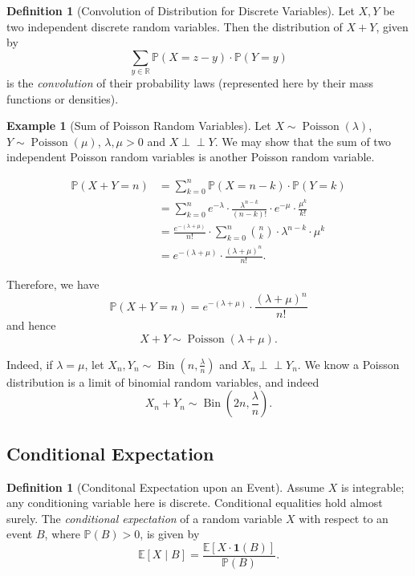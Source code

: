 \documentclass[11pt]{article}
\numberwithin{equation}{section}
\theoremstyle{definition}
\newtheorem{definition}[theorem]{Definition}
\newtheorem{example}[theorem]{Example}
\theoremstyle{remark}
\newcommand{\pqty}[1]{\left(#1\right)}
\newcommand{\bqty}[1]{\left[#1\right]}
\newcommand{\RR}{\mathbb R}
\newcommand{\indicator}{\mathbf 1}
\newcommand{\Prob}{\mathbb P}
\newcommand{\Expt}{\mathbb E}
\newcommand{\indp}{\mathrel{\perp\!\!\!\perp}}
\newcommand{\Conditional}[2]{#1\mid #2}
\newcommand{\Binomial}{\operatorname{Bin}}
\newcommand{\Poisson}{\operatorname{Poisson}}
\begin{document}
\begin{definition}[Convolution of Distribution for Discrete Variables]\label{probability-definition-033}
    \label{probability-def:convolution-distribution-discrete}%
    Let \(X, Y\) be two independent discrete random variables. Then the distribution of \(X + Y\), given by
    \[
        \sum_{y \in \RR} \Prob\pqty{X = z - y} \cdot \Prob\pqty{Y = y}
    \]
    is the \emph{convolution} of their probability laws (represented here by their mass functions or densities).
\end{definition}

\begin{example}[Sum of Poisson Random Variables]\label{probability-example-026}
    Let \(X \sim \Poisson\pqty{\lambda}\), \(Y \sim \Poisson\pqty{\mu}\), \(\lambda, \mu > 0\) and \(X \indp Y\). We may show that the sum of two independent Poisson random variables is another Poisson random variable.

    \begin{align*}
        \Prob\pqty{X + Y = n} &= \sum_{k = 0}^{n} \Prob\pqty{X = n - k} \cdot \Prob\pqty{Y = k} \\
        &= \sum_{k = 0}^{n} e^{-\lambda} \cdot \frac{\lambda^{n - k}}{\pqty{n - k}!} \cdot e^{-\mu} \cdot \frac{\mu^k}{k!} \\
        &= \frac{e^{-\pqty{\lambda + \mu}}}{n!} \cdot \sum_{k = 0}^{n} \binom{n}{k} \cdot \lambda^{n - k} \cdot \mu^k \\
        &= e^{-\pqty{\lambda + \mu}} \cdot \frac{\pqty{\lambda + \mu}^n}{n!}.
    \end{align*}

    Therefore, we have
    \[
        \Prob\pqty{X + Y = n} = e^{-\pqty{\lambda + \mu}} \cdot \frac{\pqty{\lambda + \mu}^n}{n!}
    \]
    and hence
    \[
        X + Y \sim \Poisson \pqty{\lambda + \mu}.
    \]

    Indeed, if \(\lambda = \mu\), let \(X_n, Y_n \sim \Binomial\pqty{n, \frac{\lambda}{n}}\) and \(X_n \indp Y_n\). We know a Poisson distribution is a limit of binomial random variables, and indeed
    \[
        X_n + Y_n \sim \Binomial\pqty{2n, \frac{\lambda}{n}}.
    \]
\end{example}

\subsection{Conditional Expectation}

\begin{definition}[Conditonal Expectation upon an Event]\label{probability-definition-034}
    \label{probability-def:conditional-expectation-upon-event}
Assume \(X\) is integrable; any conditioning variable here is discrete. Conditional equalities hold almost surely.
%
    The \emph{conditional expectation} of a random variable \(X\) with respect to an event \(B\), where \(\Prob\pqty{B} > 0\), is given by
    \[
        \Expt\bqty{\Conditional{X}{B}} = \frac{\Expt\bqty{X \cdot \indicator\pqty{B}}}{\Prob\pqty{B}}.
    \]
\end{definition}
\end{document}
